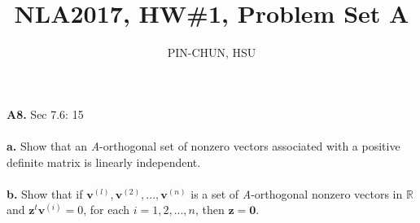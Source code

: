 \documentclass[12pt, a4paper]{article}
\title{NLA2017, HW\#1, Problem Set A}
\author{PIN-CHUN, HSU}
\begin{document}
\maketitle{}

{\large \textbf{A8.} Sec 7.6: 15} \\
\\
\textbf{a.} Show that an \textit{A}-orthogonal set of nonzero vectors associated with a positive definite matrix is linearly independent.
\\
\\
\textbf{b.} Show that if ${\mathbf{v}^{(l)}, \mathbf{v}^{(2)},... , \mathbf{v}^{(n)}}$ is a set of \textit{A}-orthogonal nonzero vectors in $\mathbb{R}$ and $\mathbf{z}^{t}\mathbf{v}^{(i)} = 0$, for each $i = 1,2,... ,n$, then $\mathbf{z} = \mathbf{0}$.
\end{document}
